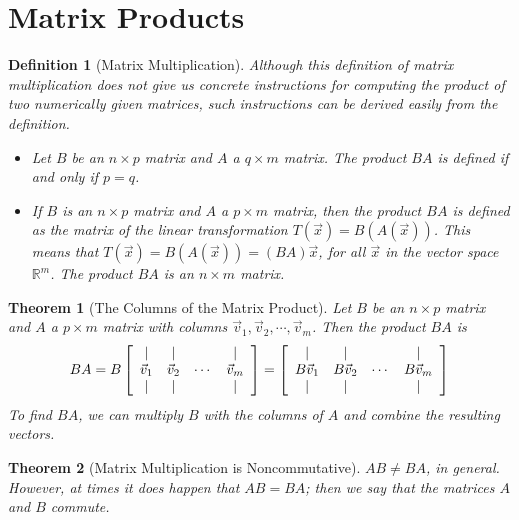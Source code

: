\documentclass[10pt]{report}
\newtheorem{thm2}{Theorem}[section]
\newtheorem{def2}{Definition}[section]
\begin{document}
\section{Matrix Products}
\begin{def2}[Matrix Multiplication]
Although this definition of matrix multiplication does not give us concrete instructions for computing the product of two numerically given matrices, such instructions can be derived easily from the definition.
\begin{itemize}
\item[1.] Let $B$ be an $n\times p$ matrix and $A$ a $q\times m$ matrix. The product $BA$ is defined if and only if $p=q$.
\item[2.] If $B$ is an $n\times p$ matrix and $A$ a $p\times m$ matrix, then the product $BA$ is defined as the matrix of the linear transformation $T(\vec{x}) = B(A(\vec{x}))$. This means that $T(\vec{x}) = B(A(\vec{x})) = (BA) \vec{x}$, for all $\vec{x}$ in the vector space $\mathbb{R}^m$. The product $BA$ is an $n\times m$ matrix.
\end{itemize}
\end{def2}
\begin{thm2}[The Columns of the Matrix Product]
Let $B$ be an $n\times p$ matrix and $A$ a $p\times m$ matrix with columns $\vec{v}_1, \vec{v}_2, \cdots, \vec{v}_m$. Then the product $BA$ is
$$BA=B\left[ \begin{array}{c c c c}
| & | & & |\\
\vec{v}_1 & \vec{v}_2 & \cdots & \vec{v}_m\\
| & | & & |
\end{array}\right] = \left[ \begin{array}{c c c c}
| & | & & |\\
B\vec{v}_1 & B\vec{v}_2 & \cdots & B\vec{v}_m\\
| & | & & |
\end{array}\right]$$
To find $BA$, we can multiply $B$ with the columns of $A$ and combine the resulting vectors.
\end{thm2}
\begin{thm2}[Matrix Multiplication is Noncommutative]
$AB\neq BA$, in general. However, at times it does happen that $AB=BA$; then we say that the matrices $A$ and $B$ commute.
\end{thm2}
\end{document}
